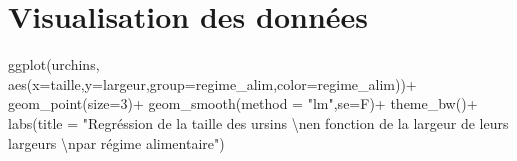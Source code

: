 \documentclass[
]{book}
\newenvironment{Shaded}{\begin{snugshade}}{\end{snugshade}}
\newcommand{\AttributeTok}[1]{\textcolor[rgb]{0.77,0.63,0.00}{#1}}
\newcommand{\DecValTok}[1]{\textcolor[rgb]{0.00,0.00,0.81}{#1}}
\newcommand{\FunctionTok}[1]{\textcolor[rgb]{0.00,0.00,0.00}{#1}}
\newcommand{\NormalTok}[1]{#1}
\newcommand{\OtherTok}[1]{\textcolor[rgb]{0.56,0.35,0.01}{#1}}
\newcommand{\SpecialCharTok}[1]{\textcolor[rgb]{0.00,0.00,0.00}{#1}}
\newcommand{\StringTok}[1]{\textcolor[rgb]{0.31,0.60,0.02}{#1}}
\begin{document}
\begin{Shaded}
\end{Shaded}

\hypertarget{visualisation-des-donnuxe9es}{%
\section{Visualisation des données}\label{visualisation-des-donnuxe9es}}

\begin{Shaded}
\begin{Highlighting}[]
\FunctionTok{ggplot}\NormalTok{(urchins,}
       \FunctionTok{aes}\NormalTok{(}\AttributeTok{x=}\NormalTok{taille,}\AttributeTok{y=}\NormalTok{largeur,}\AttributeTok{group=}\NormalTok{regime\_alim,}\AttributeTok{color=}\NormalTok{regime\_alim))}\SpecialCharTok{+}
  \FunctionTok{geom\_point}\NormalTok{(}\AttributeTok{size=}\DecValTok{3}\NormalTok{)}\SpecialCharTok{+}
  \FunctionTok{geom\_smooth}\NormalTok{(}\AttributeTok{method =} \StringTok{"lm"}\NormalTok{,}\AttributeTok{se=}\NormalTok{F)}\SpecialCharTok{+}
  \FunctionTok{theme\_bw}\NormalTok{()}\SpecialCharTok{+}
  \FunctionTok{labs}\NormalTok{(}\AttributeTok{title =} \StringTok{"Regréssion de la taille des ursins }\SpecialCharTok{\textbackslash{}n}\StringTok{en fonction de la largeur de leurs largeurs }\SpecialCharTok{\textbackslash{}n}\StringTok{par régime alimentaire"}\NormalTok{)}
\end{Highlighting}
\end{Shaded}
\end{document}
